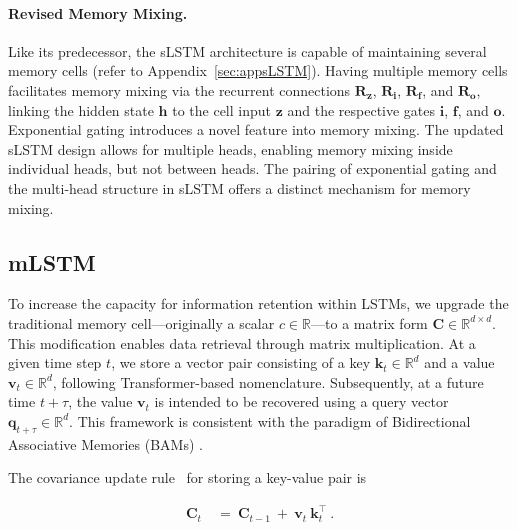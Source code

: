 \paragraph{Revised Memory Mixing.} Like its predecessor, the sLSTM architecture is capable of maintaining several memory cells (refer to Appendix~\ref{sec:appsLSTM}). Having multiple memory cells facilitates memory mixing via the recurrent connections $\mathbf{R}_{\mathbf{z}}$, $\mathbf{R}_{\mathbf{i}}$, $\mathbf{R}_{\mathbf{f}}$, and $\mathbf{R}_{\mathbf{o}}$, linking the hidden state $\mathbf{h}$ to the cell input $\mathbf{z}$ and the respective gates $\mathbf{i}$, $\mathbf{f}$, and $\mathbf{o}$. Exponential gating introduces a novel feature into memory mixing. The updated sLSTM design allows for multiple heads, enabling memory mixing inside individual heads, but not between heads. The pairing of exponential gating and the multi-head structure in sLSTM offers a distinct mechanism for memory mixing.

\subsection{mLSTM}
\label{sec:mLSTM}

To increase the capacity for information retention within LSTMs, we upgrade the traditional memory cell—originally a scalar $c \in \mathbb{R}$—to a matrix form $\mathbf{C} \in \mathbb{R}^{d \times d}$. This modification enables data retrieval through matrix multiplication. At a given time step $t$, we store a vector pair consisting of a key $\mathbf{k}_t \in \mathbb{R}^d$ and a value $\mathbf{v}_t \in \mathbb{R}^d$, following Transformer-based nomenclature. Subsequently, at a future time $t + \tau$, the value $\mathbf{v}_t$ is intended to be recovered using a query vector $\mathbf{q}_{t+\tau} \in \mathbb{R}^d$. This framework is consistent with the paradigm of Bidirectional Associative Memories (BAMs) \citep{Kohonen:72,Anderson:72,Nakano:72,Anderson:77}.

The covariance update rule~\citep{Sejnowski:77,Dayan:91} for storing a key-value pair is

\begin{align}
\mathbf{C}_t \ &= \ \mathbf{C}_{t-1} \ + \ \mathbf{v}_{t} \ \mathbf{k}_t^\top \ .
\end{align}

